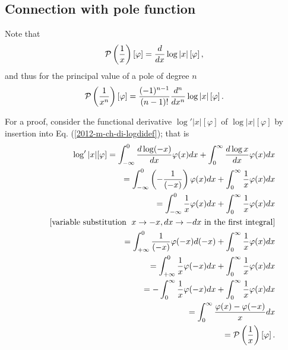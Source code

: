 \subsection{Connection with pole function}
Note that
\begin{equation}
 {\cal P} \left(\frac{1}{x}\right) \left[\varphi\right]  = \frac{d}{dx} \log \vert x \vert \left[\varphi\right]
,
\end{equation}
and thus
for the principal value of a pole of degree $n$
\begin{equation}
  {\cal P} \left(\frac{1}{x^n}\right) \left[\varphi\right]  =  \frac{(-1)^{n-1}}{(n-1)!}
\frac{d^n}{dx^n} \log \vert x \vert \left[\varphi\right]
.
\end{equation}



{\color{OliveGreen}
\bproof

For a proof, consider the functional derivative
$\log' \vert x\vert [\varphi ]$
of $\log \vert x\vert [\varphi ]$ by insertion into Eq. (\ref{2012-m-ch-di-logdidef}); that is
\begin{equation}
\begin{split}
\log' \vert x\vert [\varphi ]
=
\int_{-\infty}^0 \frac{d\log (-x)}{dx}   \varphi(x) dx
+
\int_{0}^\infty   \frac{d\log  x }{dx}    \varphi(x) dx
\\
\qquad
=
\int_{-\infty}^0 \left(-\frac{1}{(-x)}\right)   \varphi(x) dx
+
\int_{0}^\infty    \frac{1}{x}     \varphi(x) dx
\\
\qquad
=
\int_{-\infty}^0  \frac{1}{x}  \varphi(x) dx
+
\int_{0}^\infty    \frac{1}{x}     \varphi(x) dx
\\
\qquad
[\textrm{variable substitution }\; x\rightarrow -x, dx \rightarrow -dx \textrm{ in the first integral}]
\\
\qquad
=
\int_{+\infty}^0   \frac{1}{(-x)}     \varphi(-x) d(-x)
+
\int_{0}^\infty    \frac{1}{x}   \varphi(x) dx
\\
\qquad
=
\int_{+\infty}^0   \frac{1}{x}    \varphi(-x) dx
+
\int_{0}^\infty    \frac{1}{x}  \varphi(x) dx
\\
\qquad
=
-\int_0^{\infty}   \frac{1}{x}   \varphi(-x) dx
+
\int_{0}^\infty    \frac{1}{x}    \varphi(x) dx
\\
\qquad
=
\int_0^{\infty}   \frac{ \varphi(x) - \varphi(-x)}{x}  dx
\\
\qquad =
{\cal P} \left(\frac{1}{x}\right) \left[\varphi\right]
.
\end{split}
\end{equation}



\eproof
}


